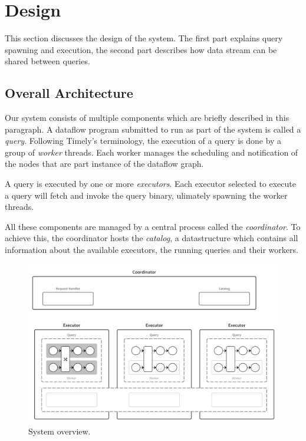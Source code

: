 \chapter{Design}\label{ch:design}

This section discusses the design of the system. The first part explains query
spawning and execution, the second part describes how data stream can be shared
between queries.

\section{Overall Architecture}

Our system consists of multiple components which are briefly described in this
paragraph. A dataflow program submitted to run as part of the system is
called a \emph{query}. Following Timely's terminology, the execution of a query
is done by a group of \emph{worker} threads. Each worker manages the scheduling and
notification of the nodes that are part instance of the dataflow graph.

A query is executed by one or more \emph{executors}. Each executor selected to
execute a query will fetch and invoke the query binary, ulimately spawning the
worker threads.

All these components are managed by a central process called the
\emph{coordinator}. To achieve this, the coordinator hosts the \emph{catalog}, a
datastructure which contains all information about the available executors, the
running queries and their workers.

\begin{figure}[h]
  \centering
    \includegraphics[width=1\textwidth]{figures/components}
  \caption{System overview.}
  \label{fig:components}
\end{figure}

